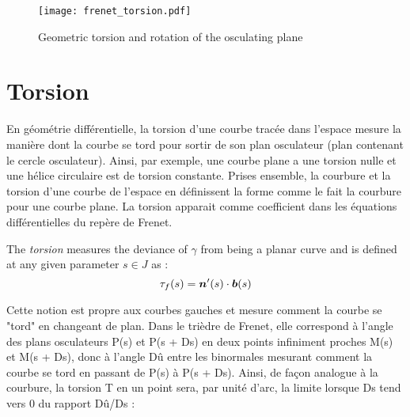 
\begin{figure}[t] 
\begin{center}
\texttt{[image: frenet\_torsion.pdf]} 
\caption{Geometric torsion and rotation of the osculating plane}
\label{fig:3_1}
\end{center}
\end{figure}

\section{Torsion}
En géométrie différentielle, la torsion d'une courbe tracée dans l'espace mesure la manière dont la courbe se tord pour sortir de son plan osculateur (plan contenant le cercle osculateur). Ainsi, par exemple, une courbe plane a une torsion nulle et une hélice circulaire est de torsion constante. Prises ensemble, la courbure et la torsion d'une courbe de l'espace en définissent la forme comme le fait la courbure pour une courbe plane. La torsion apparait comme coefficient dans les équations différentielles du repère de Frenet.

The \emph{torsion} measures the deviance of $\gamma$ from being a planar curve and is defined at any given parameter $s \in J$ as :
\begin{equation}
\tau_f(s) = \boldsymbol{n}'(s) \cdot \boldsymbol{b}(s) 
\end{equation}

Cette notion est propre aux courbes gauches et mesure comment la courbe se "tord" en changeant de plan. Dans le trièdre de Frenet, elle correspond à l'angle des plans osculateurs P(s) et P(s + Ds) en deux points infiniment proches M(s) et M(s + Ds), donc à l'angle Dû entre les binormales mesurant comment la courbe se tord en passant de P(s) à P(s + Ds). Ainsi, de façon analogue à la courbure, la torsion T en un point sera, par unité d'arc, la limite lorsque Ds tend vers 0 du rapport Dû/Ds :



